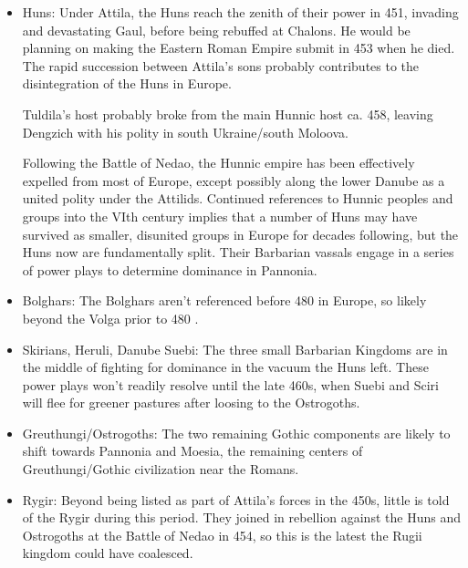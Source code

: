\documentclass{article}
\begin{document}
	\begin{itemize}
		\item Huns:\newline
		Under Attila, the Huns reach the zenith of their power in 451, invading and devastating Gaul, before being rebuffed at Chalons.
		He would be planning on making the Eastern Roman Empire submit in 453 when he died.
		The rapid succession between Attila's sons probably contributes to the disintegration of the Huns in Europe.
		
		Tuldila's host probably broke from the main Hunnic host ca. 458, leaving Dengzich with his polity in south Ukraine/south Moloova.
		
		Following the Battle of Nedao, the Hunnic empire has been effectively expelled from most of Europe, except possibly along the lower Danube as a united polity under the Attilids.
		Continued references to Hunnic peoples and groups into the VIth century implies that a number of Huns may have survived as smaller, disunited groups in Europe for decades following, but the Huns now are fundamentally split.
		Their Barbarian vassals engage in a series of power plays to determine dominance in Pannonia.
		
		\item Bolghars:\newline
		The Bolghars aren't referenced before 480 in Europe, so likely beyond the Volga prior to 480 \cite{KimHuns}.
		
		\item Skirians, Heruli, Danube Suebi:\newline
		The three small Barbarian Kingdoms are in the middle of fighting for dominance in the vacuum the Huns left.
		These power plays won't readily resolve until the late 460s, when Suebi and Sciri will flee for greener pastures after loosing to the Ostrogoths.
		
		\item Greuthungi/Ostrogoths:\newline
		The two remaining Gothic components are likely to shift towards Pannonia and Moesia, the remaining centers of Greuthungi/Gothic civilization near the Romans. 
		
		\item Rygir:\newline
		Beyond being listed as part of Attila's forces in the 450s, little is told of the Rygir during this period.
		They joined in rebellion against the Huns and Ostrogoths at the Battle of Nedao in 454, so this is the latest the Rugii kingdom could have coalesced.
		

\end{itemize}
\end{document}
